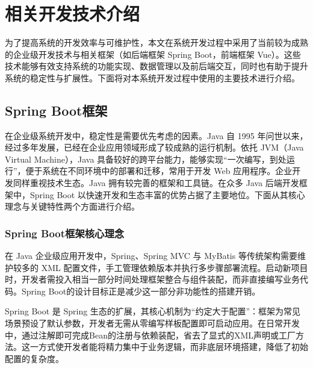 \chapter{相关开发技术介绍}
为了提高系统的开发效率与可维护性，本文在系统开发过程中采用了当前较为成熟的企业级开发技术与相关框架（如后端框架 Spring Boot，前端框架 Vue）。这些技术能够有效支持系统的功能实现、数据管理以及前后端交互，同时也有助于提升系统的稳定性与扩展性。下面将对本系统开发过程中使用的主要技术进行介绍。

\section{Spring Boot框架}
在企业级系统开发中，稳定性是需要优先考虑的因素。Java 自 1995 年问世以来，经过多年发展，已经在企业应用领域形成了较成熟的运行机制。依托 JVM\cite{oracle2015jvms8}（Java Virtual Machine），Java 具备较好的跨平台能力，能够实现“一次编写，到处运行”，便于系统在不同环境中的部署和迁移，常用于开发 Web 应用程序。企业开发同样重视技术生态。Java 拥有较完善的框架和工具链。在众多 Java 后端开发框架中，Spring Boot 以快速开发和生态丰富的优势占据了主要地位。下面从其核心理念与关键特性两个方面进行介绍。
\subsection{Spring Boot框架核心理念}
在 Java 企业级应用开发中，Spring、Spring MVC 与 MyBatis 等传统架构需要维护较多的 XML 配置文件，手工管理依赖版本并执行多步骤部署流程。启动新项目时，开发者需投入相当一部分时间处理框架整合与组件装配，而非直接编写业务代码。Spring Boot的设计目标正是减少这一部分非功能性的搭建开销。

Spring Boot 是 Spring 生态的扩展，其核心机制为“约定大于配置”\cite{springboot2025autoconfig}：框架为常见场景预设了默认参数，开发者无需从零编写样板配置即可启动应用。在日常开发中，通过注解即可完成Bean的注册与依赖装配，省去了显式的XML声明或工厂方法。这一方式使开发者能将精力集中于业务逻辑，而非底层环境搭建，降低了初始配置的复杂度。
